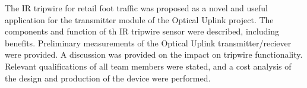 
	
	The IR tripwire for retail foot traffic was proposed as a novel and useful application for the transmitter module of the Optical Uplink project. The components and function of th IR tripwire sensor were described, including benefits. Preliminary measurements of the Optical Uplink transmitter/reciever were provided. A discussion was provided on the impact on tripwire functionality. Relevant qualifications of all team members were stated, and a cost analysis of the design and production of the device were performed.



